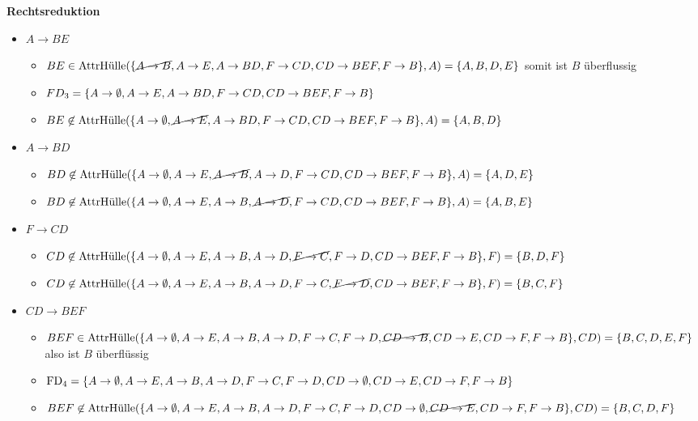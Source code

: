 \documentclass[main.tex]{subfiles}
\begin{document}
\textbf{Rechtsreduktion}
\begin{itemize}
    \item $A\to BE$
    \begin{itemize}
        \item $BE \in \text{AttrHülle}(\{\cancel{A\to B}, A\to E, A\to BD, F\to CD, CD\to BEF, F\to B\}, A) = \{A, B, D, E\}$ somit ist $B$ überflussig
        \item $FD_3 = \{A\to \emptyset, A\to E, A\to BD, F\to CD, CD\to BEF, F\to B\}$
        \item $BE \not\in \text{AttrHülle}(\{A\to \emptyset, \cancel{A\to E}, A\to BD, F\to CD, CD\to BEF, F\to B\}, A) = \{A, B, D\}$ 
    \end{itemize}
    \item $A\to BD$
    \begin{itemize}
        \item $BD \not\in \text{AttrHülle}(\{A\to \emptyset, A\to E, \cancel{A\to B}, A\to D, F\to CD, CD\to BEF, F\to B\}, A) = \{A, D, E\}$
        \item $BD \not\in \text{AttrHülle}(\{A\to \emptyset, A\to E, A\to B, \cancel{A\to D}, F\to CD, CD\to BEF, F\to B\}, A) = \{A, B, E\}$
    \end{itemize}
    \item $F\to CD$ 
    \begin{itemize}
        \item $CD \not\in \text{AttrHülle}(\{A\to \emptyset, A\to E, A\to B, A\to D, \cancel{F\to C}, F\to D, CD\to BEF, F\to B\}, F) = \{B, D, F\}$
        \item $CD \not\in \text{AttrHülle}(\{A\to \emptyset, A\to E, A\to B, A\to D, F\to C, \cancel{F\to D}, CD\to BEF, F\to B\}, F) = \{B, C, F\}$
    \end{itemize}
    \item $CD\to BEF$ 
    \begin{itemize}
        \item $BEF \in \text{AttrHülle}(\{A\to \emptyset, A\to E, A\to B, A\to D, F\to C, F\to D, \cancel{CD\to B}, CD\to E, CD\to F, F\to B\}, CD) = \{B, C, D, E, F\}$ also ist $B$ überflüssig
        \item $\text{FD}_4 = \{A\to \emptyset, A\to E, A\to B, A\to D, F\to C, F\to D, CD\to\emptyset, CD\to E, CD\to F, F\to B\}$
        \item $BEF \not\in \text{AttrHülle}(\{A\to \emptyset, A\to E, A\to B, A\to D, F\to C, F\to D, CD\to\emptyset, \cancel{CD\to E}, CD\to F, F\to B\}, CD) = \{B, C, D, F\}$ 

\end{itemize}
\end{itemize}
\end{document}
